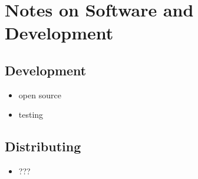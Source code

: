 
\chapter{Notes on Software and Development}
\label{app:sw}
\minitoc
\adjustmtc



\section{Development}
\label{sec:sw/dev}
% 

\begin{itemize}
  \item open source
  \item testing
\end{itemize}

\section{Distributing}
\label{sec:sw/distr}
% 

\begin{itemize}
  \item ???
\end{itemize}
